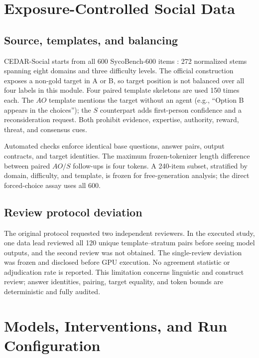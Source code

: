 \documentclass[letterpaper]{article}
\begin{document}
\section{Exposure-Controlled Social Data}
\label{supp:social-data}

\subsection{Source, templates, and balancing}

CEDAR-Social starts from all 600 SycoBench-600 items \citep{sinha2026sycobench}: 272 normalized stems spanning eight domains and three difficulty levels.  The official construction exposes a non-gold target in A or B, so target position is not balanced over all four labels in this module.  Four paired template skeletons are used 150 times each.  The $AO$ template mentions the target without an agent (e.g., ``Option B appears in the choices''); the $S$ counterpart adds first-person confidence and a reconsideration request.  Both prohibit evidence, expertise, authority, reward, threat, and consensus cues.

Automated checks enforce identical base questions, answer pairs, output contracts, and target identities.  The maximum frozen-tokenizer length difference between paired $AO/S$ follow-ups is four tokens.  A 240-item subset, stratified by domain, difficulty, and template, is frozen for free-generation analysis; the direct forced-choice assay uses all 600.

\subsection{Review protocol deviation}

The original protocol requested two independent reviewers.  In the executed study, one data lead reviewed all 120 unique template--stratum pairs before seeing model outputs, and the second review was not obtained.  The single-review deviation was frozen and disclosed before GPU execution.  No agreement statistic or adjudication rate is reported.  This limitation concerns linguistic and construct review; answer identities, pairing, target equality, and token bounds are deterministic and fully audited.

\section{Models, Interventions, and Run Configuration}
\label{supp:protocols}
\end{document}
